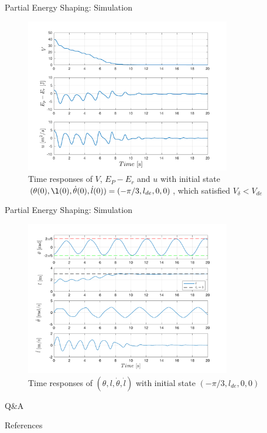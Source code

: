 \documentclass[10pt]{beamer}
\begin{document}
  \begin{frame}{Partial Energy Shaping: Simulation}
    \begin{figure}
      \caption*{Time responses of $V$, $E_P-E_r$ and $u$ with initial state 
        $(\theta(0), \l(0), \dot{\theta}(0), \dot{l}(0))=(-\pi/3, l_{de}, 0,
        0)$, which satisfied $V_\delta < V_{de}$}
      \vspace{-0.3cm}
      \includegraphics[width=0.8\textwidth]{images/partial_1b.pdf}
    \end{figure}
  \end{frame}

 \begin{frame}{Partial Energy Shaping: Simulation}
    \begin{figure}
      \caption*{Time responses of $(\theta, l, \dot{\theta}, \dot{l})$ with 
        initial state $(-\pi/3, l_{de}, 0, 0)$}
      \vspace{-0.3cm}
      \includegraphics[width=0.8\textwidth]{images/partial_2b.pdf}
    \end{figure}
  \end{frame}

\begin{frame}[standout]
    Q\&A
  \end{frame}

  \appendix

  \begin{frame}{References}
    
    
  \end{frame}
\end{document}
